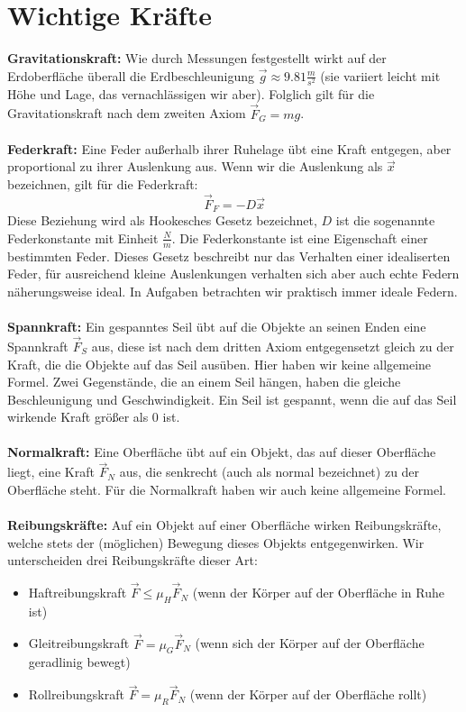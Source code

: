 \documentclass[11pt]{article}
\begin{document}
\section{Wichtige Kräfte}
\textbf{Gravitationskraft:} Wie durch Messungen festgestellt wirkt auf der Erdoberfläche überall die Erdbeschleunigung $\vec{g} \approx 9.81 \frac{m}{s^2}$ (sie variiert leicht mit Höhe und Lage, das vernachlässigen wir aber). Folglich gilt für die Gravitationskraft nach dem zweiten Axiom $\vec{F}_G = mg$. \\\\
\textbf{Federkraft:} Eine Feder außerhalb ihrer Ruhelage übt eine Kraft entgegen, aber proportional zu ihrer Auslenkung aus. Wenn wir die Auslenkung als $\vec{x}$ bezeichnen, gilt für die Federkraft: 
\begin{equation*}
    \vec{F}_F = -D\vec{x}
\end{equation*}
Diese Beziehung wird als Hookesches Gesetz bezeichnet, $D$ ist die sogenannte Federkonstante mit Einheit $\frac{N}{m}$. Die Federkonstante ist eine Eigenschaft einer bestimmten Feder. Dieses Gesetz beschreibt nur das Verhalten einer idealiserten Feder, für ausreichend kleine Auslenkungen verhalten sich aber auch echte Federn näherungsweise ideal. In Aufgaben betrachten wir praktisch immer ideale Federn. \\\\
\textbf{Spannkraft:} Ein gespanntes Seil übt auf die Objekte an seinen Enden eine Spannkraft $\vec{F}_S$ aus, diese ist nach dem dritten Axiom entgegensetzt gleich zu der Kraft, die die Objekte auf das Seil ausüben. Hier haben wir keine allgemeine Formel. Zwei Gegenstände, die an einem Seil hängen, haben die gleiche Beschleunigung und Geschwindigkeit. Ein Seil ist gespannt, wenn die auf das Seil wirkende Kraft größer als $0$ ist. \\\\
\textbf{Normalkraft:} Eine Oberfläche übt auf ein Objekt, das auf dieser Oberfläche liegt, eine Kraft $\vec{F}_N$ aus, die senkrecht (auch als normal bezeichnet) zu der Oberfläche steht. Für die Normalkraft haben wir auch keine allgemeine Formel. \\\\
\textbf{Reibungskräfte:} Auf ein Objekt auf einer Oberfläche wirken Reibungskräfte, welche stets der (möglichen) Bewegung dieses Objekts entgegenwirken. Wir unterscheiden drei Reibungskräfte dieser Art: 
\begin{itemize}
    \item Haftreibungskraft $\vec{F} \leq \mu_H \vec{F}_N$ (wenn der Körper auf der Oberfläche in Ruhe ist)
    \item Gleitreibungskraft $\vec{F} = \mu_G \vec{F}_N$ (wenn sich der Körper auf der Oberfläche geradlinig bewegt)
    \item Rollreibungskraft $\vec{F} = \mu_R \vec{F}_N$ (wenn der Körper auf der Oberfläche rollt)
\end{itemize}
\end{document}

